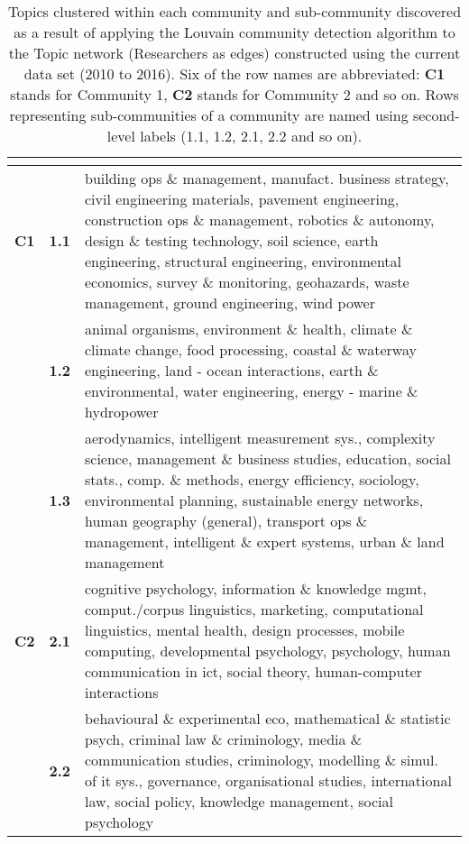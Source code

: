 \begin{spacing}{0.9}
\begin{longtable}[r]{r|r|p{11.5cm}}
\caption[Topics clustered within each community and sub-community discovered in the Topic network (Researchers as edges) constructed using the current data set (2010 to 2016)]{Topics clustered within each community and sub-community discovered as a result of applying the Louvain community detection algorithm to the Topic network (Researchers as edges) constructed using the current data set (2010 to 2016). Six of the row names are abbreviated: \textbf{C1} stands for Community 1, \textbf{C2} stands for Community 2 and so on. Rows representing sub-communities of a community are named using second-level labels (1.1, 1.2, 2.1, 2.2 and so on).}\\
\label{table:topic_b_current_clusters_appendix}
{} & {}\\
\hline
\endhead
\textbf{C1}
& \textbf{1.1} & {building ops \& management, manufact. business strategy, civil engineering materials, pavement engineering, construction ops \& management, robotics \& autonomy, design \& testing technology, soil science, earth engineering, structural engineering, environmental economics, survey \& monitoring, geohazards, waste management, ground engineering, wind power}\\
& \textbf{1.2} & {animal organisms, environment \& health, climate \& climate change, food processing, coastal \& waterway engineering, land - ocean interactions, earth \& environmental, water engineering, energy - marine \& hydropower}\\
& \textbf{1.3} & {aerodynamics, intelligent measurement sys., complexity science, management \& business studies, education, social stats., comp. \& methods, energy efficiency, sociology, environmental planning, sustainable energy networks, human geography (general), transport ops \& management, intelligent \& expert systems, urban \& land management}\\
\hline
\textbf{C2}
& \textbf{2.1} & {cognitive psychology, information \& knowledge mgmt, comput./corpus linguistics, marketing, computational linguistics, mental health, design processes, mobile computing, developmental psychology, psychology, human communication in ict, social theory, human-computer interactions}\\
& \textbf{2.2} & {behavioural \& experimental eco, mathematical \& statistic psych, criminal law \& criminology, media \& communication studies, criminology, modelling \& simul. of it sys., governance, organisational studies, international law, social policy, knowledge management, social psychology}\\

\end{longtable}
\end{spacing}
